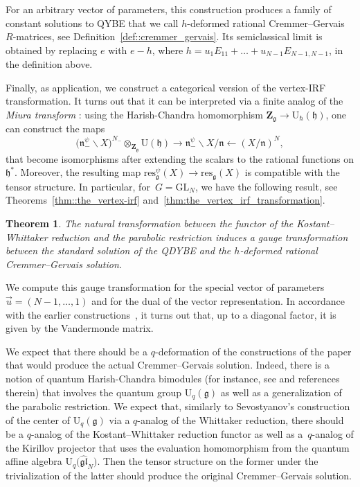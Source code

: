 \documentclass[10pt,a4paper]{article}
\numberwithin{equation}{section}
\newtheorem{thmx}{Theorem}
\newcommand{\U}{\mathrm{U}_{\hbar}}
\newcommand{\Z}{\mathbf{Z}}
\newcommand{\GL}{\mathrm{GL}}
\newcommand{\g}{\mathfrak{g}}
\newcommand{\h}{\mathfrak{h}}
\newcommand{\n}{\mathfrak{n}}
\newcommand{\res}{\mathrm{res}}
\newcommand{\gl}{\mathfrak{gl}}
\begin{document}
	For an arbitrary vector of parameters, this construction produces a family of constant solutions to QYBE that we call $h$-deformed rational Cremmer--Gervais $R$-matrices, see Definition~\ref{def::cremmer_gervais}. Its semiclassical limit is obtained by replacing $e$ with $e-h$, where $h = u_1 E_{11} + \dots + u_{N-1} E_{N-1,N-1}$, in the definition above.
	
	Finally, as application, we construct a categorical version of the vertex-IRF transformation. It turns out that it can be interpreted via a finite analog of the \emph{Miura transform} \cite{GinzburgKazhdan}: using the Harish-Chandra homomorphism $\Z_{\g} \rightarrow \U(\h)$, one can construct the maps
	\[
	\bigl(\n_-^{\psi} \backslash X\bigr)^{N_-} \otimes_{\Z_{\g}} \mathrm{U}(\h) \rightarrow \n_-^{\psi} \backslash X /\n \leftarrow (X/\n)^{N},
	\]
	that become isomorphisms after extending the scalars to the rational functions on $\h^*$. Moreover, the resulting map $\res^{\psi}_{\g} (X) \rightarrow \res_{\g}(X)$ is compatible with the tensor structure. In particular, for~${G = \GL_N}$, we have the following result, see Theorems~\ref{thm::the_vertex-irf} and~\ref{thm:the_vertex_irf_transformation}.
	
	\begin{thmx}
		The natural transformation between the functor of the Kostant--Whittaker reduction and the parabolic restriction induces a gauge transformation between the standard solution of the QDYBE and the $h$-deformed rational Cremmer--Gervais solution.
	\end{thmx}
	
	We compute this gauge transformation for the special vector of parameters $\vec{u} = (N-1,\dots,1)$ and for the dual of the vector representation. In accordance with the
	earlier constructions~\cite{BalogDabrowskiFeher,BuffenoirRocheTerras,CremmerGervais}, it turns out that, up to a diagonal factor, it is given by the Vandermonde matrix.
	
	We expect that there should be a $q$-deformation of the constructions of the paper that would produce the actual Cremmer--Gervais solution. Indeed, there is a notion of quantum Harish-Chandra bimodules (for instance, see \cite[Section 2.5]{KalmykovSafronov} and references therein) that involves the quantum group $\mathrm{U}_q(\g)$ as well as a generalization of the parabolic restriction. We expect that, similarly to Sevostyanov's construction \cite{SevostyanovWhittakerModules} of the center of $\mathrm{U}_q(\g)$ via a $q$-analog of the Whittaker reduction, there should be a $q$-analog of the Kostant--Whittaker reduction functor as well as a~$q$-analog of the Kirillov projector that uses the evaluation homomorphism from the quantum affine algebra $\mathrm{U}_q\bigl(\hat{\gl}_N\bigr)$. Then the tensor structure on the former under the trivialization of the latter should produce the original Cremmer--Gervais solution.
	
\end{document}
